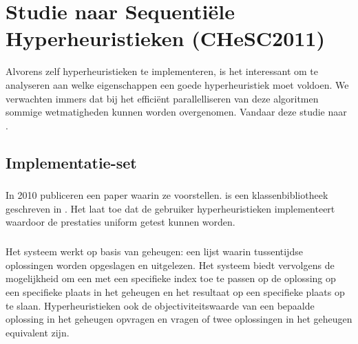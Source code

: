 \chapter{Studie naar Sequenti\"ele Hyperheuristieken (CHeSC2011)}

Alvorens zelf hyperheuristieken te implementeren, is het interessant om te analyseren aan welke eigenschappen een goede hyperheuristiek moet voldoen. We verwachten immers dat bij het effici\"ent parallelliseren van deze algoritmen sommige wetmatigheden kunnen worden overgenomen. Vandaar deze studie naar \abseqe{} \abhhn{}.

\section{Implementatie-set}

\subsection{\abhf{}}

In 2010 publiceren  een paper waarin ze \abhf{} voorstellen. \abhf{} is een klassenbibliotheek geschreven in \abjava{}. Het laat toe dat de gebruiker hyperheuristieken implementeert waardoor de prestaties uniform getest kunnen worden.

\paragraph{}
Het systeem werkt op basis van geheugen: een lijst waarin tussentijdse oplossingen worden opgeslagen en uitgelezen. Het systeem biedt vervolgens de mogelijkheid om een \abllh{} met een specifieke index toe te passen op de oplossing op een specifieke plaats in het geheugen en het resultaat op een specifieke plaats op te slaan. Hyperheuristieken ook de objectiviteitswaarde van een bepaalde oplossing in het geheugen opvragen en vragen of twee oplossingen in het geheugen equivalent zijn.

